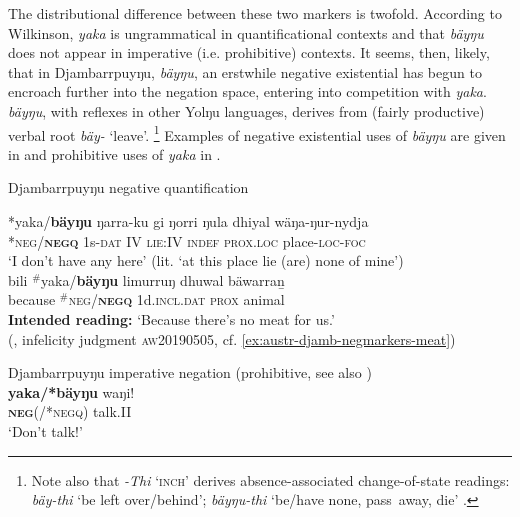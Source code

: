 \documentclass[output=paper]{langsci/langscibook}
\begin{document}
The distributional difference between these two markers is twofold.
    According to Wilkinson, \textit{yaka} is ungrammatical in
    quantificational contexts and that \textit{bäyŋu} does not appear in
    imperative (i.e. prohibitive) contexts. It seems, then,
    likely, that in Djambarrpuyŋu, \textit{bäyŋu}, an erstwhile negative
    existential has begun to encroach further into the negation space,
    entering into competition with \textit{yaka}. \textit{bäyŋu}, with
    reflexes in other Yolŋu languages, derives from (fairly productive)
    verbal root \textit{bäy-} `leave'.%
%
\footnote{Note also that \textit{-Thi} `\textsc{inch}' derives
    absence-associated change-of-state readings: \textit{bäy-thi} `be left
    over\slash behind'; \textit{bäyŋu-thi} `be\slash have none, pass~away,
    die' \citep[378]{Wilkinson1991}.} 
%
Examples of negative existential uses of \textit{bäyŋu} are given in
     and prohibitive uses of
    \textit{yaka} in .
%
\begin{exe}\ex\label{ex:austr-djamb-neg-quantities} Djambarrpuyŋu negative quantification
    \begin{xlist}
\ex \gll {\op}*yaka/{\cp}\textbf{bäyŋu} ŋarra-ku gi ŋorri ŋula dhiyal wäŋa-ŋur-nydja\\
	\textsc{*neg/\textbf{negq}} 1s\textsc{-dat} \textsc{IV} \textsc{lie:IV} \textsc{indef} \textsc{prox.loc} place-\textsc{loc-foc}\\
	\glt `I don't have any here' (lit. `at this place lie (are) none of
        mine') \\ \hfill\citep[691]{Wilkinson1991}
%	
\ex\gll bili {\op}$^\#$yaka/{\cp}\textbf{bäyŋu} limurruŋ dhuwal bäwarraṉ\\
because \textsc{$^\#$neg/\textbf{negq}} 1d.\textsc{incl.dat} \textsc{prox} animal\\
\glt \textbf{Intended reading:} `Because there's no meat for us.' \\ 
        \hfill (\citealp[560]{Wilkinson1991}, infelicity judgment
        \textsc{aw20190505}, cf. \ref{ex:austr-djamb-negmarkers-meat})
    \end{xlist}
%
\ex\label{ex:austr-djamb-prohib} 
Djambarrpuyŋu imperative negation (prohibitive, see also )\\
\gll \textbf{yaka{\op}/*bäyŋu{\cp}} waŋi!\\
\textsc{\textbf{neg}(/*negq)} talk.II\\
\glt `Don't talk!' \hfill {\citep[360]{Wilkinson1991}}\\\end{exe}
\end{document}
